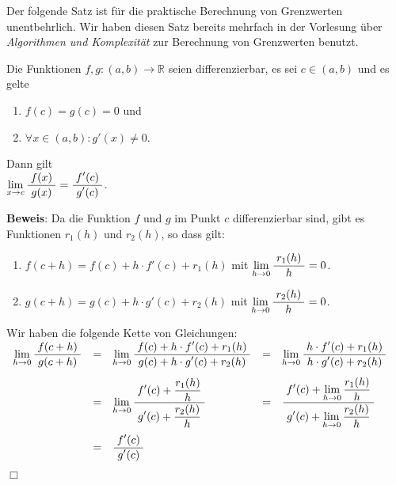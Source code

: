 Der folgende Satz ist f\"ur die praktische Berechnung von Grenzwerten unentbehrlich.  Wir haben
diesen Satz bereits mehrfach in der Vorlesung \"uber \emph{Algorithmen und Komplexit\"at} zur
Berechnung von Grenzwerten benutzt.

\begin{Satz} \lb 
  Die Funktionen $f,g: (a,b) \rightarrow \mathbb{R}$ seien
  differenzierbar, es sei $c \in (a,b)$ und es gelte
  \begin{enumerate}
  \item $f(c) = g(c) = 0$ \quad und
  \item $\forall x \in (a,b):  g'(x) \not= 0$.
  \end{enumerate}
  Dann gilt 
  \\[0.3cm]
  \hspace*{1.3cm}
  $\lim\limits_{x \rightarrow c} \displaystyle\frac{\;\displaystyle f(x)\;}{\;\displaystyle g(x)\;} = \displaystyle\frac{\;\displaystyle f'(c)\;}{\;\displaystyle g'(c)\;}$.
\end{Satz}

\noindent
\textbf{Beweis}: 
Da die Funktion $f$ und $g$ im Punkt $c$ differenzierbar sind, gibt es Funktionen $r_1(h)$
und $r_2(h)$, so dass gilt:
\begin{enumerate}
\item $f(c+h) = f(c) + h\cdot f'(c) + r_1(h)$ \quad mit $\lim\limits_{h \rightarrow 0} \displaystyle\frac{\;\displaystyle r_1(h)\;}{\;\displaystyle h\;} = 0$.
\item $g(c+h) = g(c) + h\cdot g'(c) + r_2(h)$ \quad mit $\lim\limits_{h \rightarrow 0} \displaystyle\frac{\;\displaystyle r_2(h)\;}{\;\displaystyle h\;} = 0$.
\end{enumerate}
Wir haben die folgende Kette von Gleichungen:
\\[0.3cm]
\hspace*{1.3cm}
$
\begin{array}[b]{lclcl}
    \lim\limits_{h \rightarrow 0} \displaystyle\frac{\;\displaystyle f(c+h)\;}{\;\displaystyle g(c+h)\;} &=&
    \lim\limits_{h \rightarrow 0} \displaystyle\frac{\;\displaystyle f(c) + h\cdot f'(c) + r_1(h)\;}{\;\displaystyle g(c) + h\cdot g'(c) + r_2(h)\;} 
&=& \lim\limits_{h \rightarrow 0} \displaystyle\frac{\;\displaystyle h\cdot f'(c) + r_1(h)\;}{\;\displaystyle h\cdot g'(c) + r_2(h)\;} \\[0.5cm]
&=& \lim\limits_{h \rightarrow 0} \displaystyle\frac{\;\displaystyle f'(c) + \frac{r_1(h)}{h}\;}{\;\displaystyle g'(c) + \frac{r_2(h)}{h}\;} 
&=& \displaystyle\frac{\;\displaystyle f'(c) + \lim\limits_{h \rightarrow 0} \frac{r_1(h)}{h}\;}{\;\displaystyle g'(c) + \lim\limits_{h \rightarrow 0} \frac{r_2(h)}{h}\;} \\[0.8cm]
&=& \displaystyle\frac{\;\displaystyle f'(c)\;}{\;\displaystyle g'(c)\;} \\[0.5cm]
\end{array}
$
\hspace*{\fill} $\Box$


